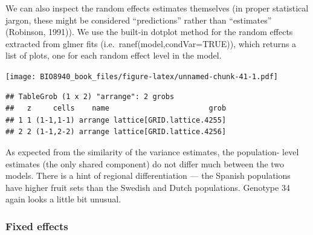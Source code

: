 \documentclass[
  12pt,
]{book}
\newenvironment{Shaded}{\begin{snugshade}}{\end{snugshade}}
\newcommand{\DataTypeTok}[1]{\textcolor[rgb]{0.13,0.29,0.53}{#1}}
\newcommand{\DecValTok}[1]{\textcolor[rgb]{0.00,0.00,0.81}{#1}}
\newcommand{\KeywordTok}[1]{\textcolor[rgb]{0.13,0.29,0.53}{\textbf{#1}}}
\newcommand{\NormalTok}[1]{#1}
\newcommand{\OperatorTok}[1]{\textcolor[rgb]{0.81,0.36,0.00}{\textbf{#1}}}
\newcommand{\OtherTok}[1]{\textcolor[rgb]{0.56,0.35,0.01}{#1}}
\newcommand{\StringTok}[1]{\textcolor[rgb]{0.31,0.60,0.02}{#1}}
\begin{document}
We can also inspect the random effects estimates themselves (in proper statistical jargon, these might be considered ``predictions'' rather than ``estimates'' (Robinson, 1991)). We use the built-in dotplot method for the random effects extracted from glmer fits (i.e.~ranef(model,condVar=TRUE)), which returns a list of plots, one for each random effect level in the model.

\begin{Shaded}
\end{Shaded}

\texttt{[image: BIO8940\_book\_files/figure-latex/unnamed-chunk-41-1.pdf]}

\begin{verbatim}
## TableGrob (1 x 2) "arrange": 2 grobs
##   z     cells    name                       grob
## 1 1 (1-1,1-1) arrange lattice[GRID.lattice.4255]
## 2 2 (1-1,2-2) arrange lattice[GRID.lattice.4256]
\end{verbatim}

As expected from the similarity of the variance estimates, the population- level estimates (the only shared component) do not differ much between the two models. There is a hint of regional differentiation --- the Spanish populations have higher fruit sets than the Swedish and Dutch populations. Genotype 34 again looks a little bit unusual.

\hypertarget{fixed-effects}{%
\subsubsection{Fixed effects}\label{fixed-effects}}
\end{document}
